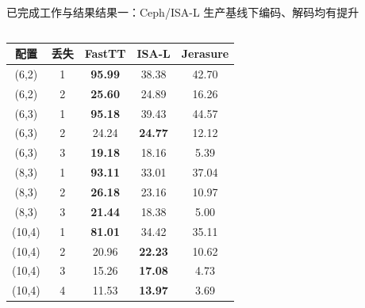 \begin{frame}[t]{已完成工作与结果}{结果一：Ceph/ISA-L 生产基线下编码、解码均有提升}
\begin{columns}[T,onlytextwidth]
        \vspace{0.15em}
        \scriptsize
        \setlength{\tabcolsep}{2.5pt}
        \renewcommand{\arraystretch}{0.86}
        \begin{tabular}{ccccc}
            \toprule
            配置 & 丢失 & FastTT & ISA-L & Jerasure \\
            \midrule
            (6,2)  & 1 & \textbf{95.99} & 38.38 & 42.70 \\
            (6,2)  & 2 & \textbf{25.60} & 24.89 & 16.26 \\
            (6,3)  & 1 & \textbf{95.18} & 39.43 & 44.57 \\
            (6,3)  & 2 & 24.24 & \textbf{24.77} & 12.12 \\
            (6,3)  & 3 & \textbf{19.18} & 18.16 & 5.39 \\
            (8,3)  & 1 & \textbf{93.11} & 33.01 & 37.04 \\
            (8,3)  & 2 & \textbf{26.18} & 23.16 & 10.97 \\
            (8,3)  & 3 & \textbf{21.44} & 18.38 & 5.00 \\
            (10,4) & 1 & \textbf{81.01} & 34.42 & 35.11 \\
            (10,4) & 2 & 20.96 & \textbf{22.23} & 10.62 \\
            (10,4) & 3 & 15.26 & \textbf{17.08} & 4.73 \\
            (10,4) & 4 & 11.53 & \textbf{13.97} & 3.69 \\
            \bottomrule
        \end{tabular}

    \end{columns}

\end{frame}

